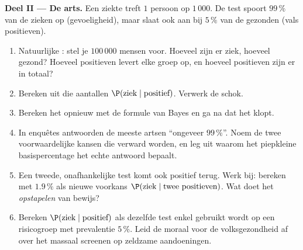 \begin{problem}
\medskip
\noindent\textbf{Deel II --- De arts.}
Een ziekte treft $1$ persoon op $1\,000$. De test spoort $99\,\%$ van de
zieken op (gevoeligheid), maar slaat ook aan bij $5\,\%$ van de gezonden
(vals positieven).
\begin{enumerate}[resume]
  \item Natuurlijke : stel je $100\,000$ mensen voor. Hoeveel zijn
        er ziek, hoeveel gezond? Hoeveel positieven levert elke groep op, en
        hoeveel positieven zijn er in totaal?
  \item Bereken uit die aantallen $\P(\text{ziek} \mid \text{positief})$.
        Verwerk de schok.
  \item Bereken het opnieuw met de formule van Bayes en ga na dat het klopt.
  \item In enquêtes antwoorden de meeste artsen ``ongeveer $99\,\%$''. Noem de
        twee voorwaardelijke kansen die verward worden, en leg uit waarom het
        piepkleine basispercentage het echte antwoord bepaalt.
  \item Een tweede, onafhankelijke test komt ook positief terug. Werk bij:
        bereken met $1.9\,\%$ als nieuwe voorkans
        $\P(\text{ziek} \mid \text{twee positieven})$. Wat doet het
        \emph{opstapelen} van bewijs?
  \item Bereken $\P(\text{ziek} \mid \text{positief})$ als dezelfde test enkel
        gebruikt wordt op een risicogroep met prevalentie $5\,\%$. Leid de
        moraal voor de volksgezondheid af over het massaal screenen op
        zeldzame aandoeningen.
\end{enumerate}


\end{problem}
